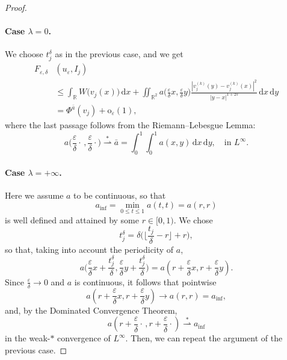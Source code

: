 \documentclass[10pt,a4paper]{amsart}
\newcommand{\R}{\mathbb{R}}
\newcommand{\del}{\delta}
\newcommand{\de}{\mathrm{d}}
\newcommand{\e}{\varepsilon}
\newcommand{\mr}{\mathrm}
\begin{document}
\begin{proof}
    \paragraph{Case $\lambda = 0$.}     
    We choose $t_j^\delta$ as in the previous case, and we get
     \begin{equation*}
      \begin{split}
             F_{\e,\delta}&(u_\e, I_j)\\
              &\leq\int_\R W\big(v_j(  x)\big) \,\de  x +\iint_{\R^2}a\Big( \frac{\e}{\del}x, \frac{\e}{\del}y \Big)\frac{|v_{j}^{(k)}(  y)-v^{(k)}_{j}( x)|^2}{|y-x|^{1+2s}} \,\de x\,\de y\\ 
                   &=\Phi^{\bar a}(v_j)+\mr o_\e(1),
      \end{split}
    \end{equation*}
where the last passage follows from the Riemann--Lebesgue Lemma:
$$a\Big(\frac{\e}{\delta}\cdot\,,\frac{\e}{\delta}\cdot\Big)\overset{*}{\rightharpoonup}  \bar a=\int_0^1\int_0^1a(x,y)\,\de x\,\de y, \quad\text{in } L^\infty.$$
  
    
    \paragraph{Case $\lambda = +\infty$.}
    Here we assume $a$ to be continuous, so that  
    \[a_{\inf} = \min_{0\leq t\leq 1} a(t,t)=a(r,r)\] 
    is well defined and attained by some $r\in [0,1)$. We chose
    \[t^\delta_j = \del\Big(\Big\lfloor\frac{t_j}{\delta}-r\Big\rfloor + r\Big),\] so that, taking into account the periodicity of $a$,  
    \[a\Big( \frac{\e}{\del}x+\frac{t^\delta_j}{\del}, \frac{\e}{\del}y+\frac{t^\delta_j}{\del}\Big)= a\left(r+ \frac{\e}{\delta}x, r+ \frac{\e}{\delta}y\right).\]
    Since $\frac{\e}{\delta} \rightarrow 0$ and $a$ is continuous, it follows that pointwise
    \[a\left(r+ \frac{\e}{\delta}x, r+ \frac{\e}{\delta}y\right) \rightarrow a(r,r) = a_{\inf},\]
    and, by the Dominated Convergence Theorem,
    \[a \left(r+ \frac{\e}{\delta}\cdot\, , r+ \frac{\e}{\delta}\cdot\right) \overset{*}{\rightharpoonup}  a_{\inf}\]
    in the weak-$*$ convergence of $L^\infty$. Then, we can repeat the argument of the previous case.
\end{proof}
\end{document}
